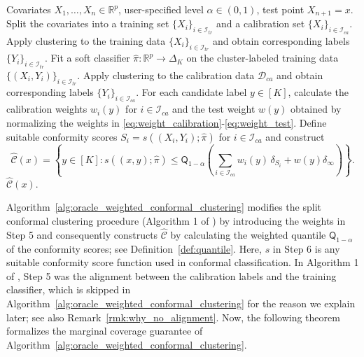 \documentclass[11pt,letterpaper]{article}
\theoremstyle{definition}
\newcommand{\cC}{\mathcal{C}}
\newcommand{\cD}{\mathcal{D}}
\newcommand{\cI}{\mathcal{I}}
\newcommand{\R}{\mathbb{R}}
\begin{document}
\renewcommand{\thealgorithm}{0} %
\begin{algorithm}[!htbp]
    \caption{Weighted Split Conformal Clustering (Oracle)}
    \label{alg:oracle_weighted_conformal_clustering}
    \begin{algorithmic}[1]
        \REQUIRE Covariates \(X_1, \ldots, X_n \in \R^p\), user-specified level \(\alpha \in (0, 1)\), test point $X_{n+1} = x$.
        \STATE Split the covariates into a training set \(\{X_i\}_{i \in \cI_{tr}}\) and a calibration set \(\{X_i\}_{i \in \cI_{ca}}\).
        \STATE Apply clustering to the training data \(\{X_i\}_{i \in \cI_{tr}}\) and obtain corresponding labels \(\{Y_i\}_{i \in \cI_{tr}}\).
        \STATE Fit a soft classifier \(\hat{\pi} \colon \R^p \to \Delta_K\) on the cluster-labeled training data \(\{(X_i, Y_i)\}_{i \in \cI_{tr}}\).
        \STATE Apply clustering to the calibration data \(\cD_{ca}\) and obtain corresponding labels $\{Y_i\}_{i \in \cI_{ca}}$. 
        \STATE For each candidate label \(y \in [K]\), calculate the calibration weights $w_i(y)$ for $i \in \cI_{ca}$ and the test weight $w(y)$ obtained by normalizing the weights in \eqref{eq:weight_calibration}-\eqref{eq:weight_test}.
        \STATE Define suitable conformity scores $S_i = s((X_i, Y_i); \hat{\pi})$ for $i \in \cI_{ca}$ and construct
        \begin{equation*}
            \hat{\cC}(x) = \left\{y \in [K] : s((x, y); \hat{\pi}) \le \mathsf{Q}_{1 - \alpha}\left({\textstyle\sum_{i \in \cI_{ca}}} w_i(y) \, \delta_{S_i} + w(y) \delta_{\infty}\right)\right\}.
        \end{equation*}
        \vspace*{-10pt}
        \RETURN \(\hat{\cC}(x)\).
    \end{algorithmic}
\end{algorithm}

Algorithm~\ref{alg:oracle_weighted_conformal_clustering} modifies the split conformal clustering procedure (Algorithm 1 of \cite{hur2026inference}) by introducing the weights in Step 5 and consequently constructs $\hat{\cC}$ by calculating the weighted quantile $\mathsf{Q}_{1 - \alpha}$ of the conformity scores; see Definition~\ref{def:quantile}. Here, $s$ in Step 6 is any suitable conformity score function used in conformal classification. In Algorithm 1 of \cite{hur2026inference}, Step 5 was the alignment between the calibration labels and the training classifier, which is skipped in Algorithm~\ref{alg:oracle_weighted_conformal_clustering} for the reason we explain later; see also Remark~\ref{rmk:why_no_alignment}. Now, the following theorem formalizes the marginal coverage guarantee of Algorithm~\ref{alg:oracle_weighted_conformal_clustering}.
\end{document}
